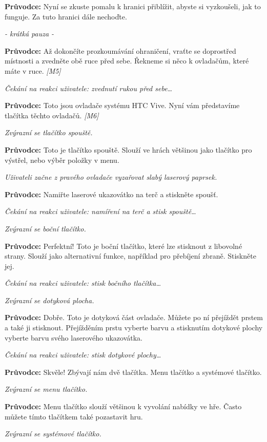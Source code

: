 \textbf{Průvodce:} Nyní se zkuste pomalu k hranici přiblížit, abyste si
vyzkoušeli, jak to funguje. Za tuto hranici dále nechoďte.

\emph{- krátká pauza -}

\textbf{Průvodce:} Až dokončíte prozkoumávání ohraničení, vraťte se
doprostřed místnosti a zvedněte obě ruce před sebe. Řekneme si něco k
ovladačům, které máte v ruce. \emph{{[}M5{]}}

\emph{Čekání na reakci uživatele: zvednutí rukou před sebe\ldots{}}

\textbf{Průvodce:} Toto jsou ovladače systému HTC Vive. Nyní vám
představíme tlačítka těchto ovladačů. \emph{{[}M6{]}}

\emph{Zvýrazní se tlačítko spouště.}

\textbf{Průvodce:} Toto je tlačítko spouště. Slouží ve hrách většinou
jako tlačítko pro výstřel, nebo výběr položky v menu.

\emph{Uživateli začne z pravého ovladače vyzařovat slabý laserový
paprsek.}

\textbf{Průvodce:} Namiřte laserové ukazovátko na terč a stiskněte
spoušť.

\emph{Čekání na reakci uživatele: namíření na terč a stisk
spouště\ldots{}}

\emph{Zvýrazní se boční tlačítko.}

\textbf{Průvodce:} Perfektní! Toto je boční tlačítko, které lze
stisknout z libovolné strany. Slouží jako alternativní funkce, například
pro přebíjení zbraně. Stiskněte jej.

\emph{Čekání na reakci uživatele: stisk bočního tlačítka\ldots{}}

\emph{Zvýrazní se dotyková plocha.}

\textbf{Průvodce:} Dobře. Toto je dotyková část ovladače. Můžete po ní
přejíždět prstem a také ji stisknout. Přejížděním prstu vyberte barvu a
stisknutím dotykové plochy vyberte barvu svého laserového ukazovátka.

\emph{Čekání na reakci uživatele: stisk dotykové plochy\ldots{}}

\textbf{Průvodce:} Skvěle! Zbývají nám dvě tlačítka. Menu tlačítko a
systémové tlačítko.

\emph{Zvýrazní se menu tlačítko.}

\textbf{Průvodce:} Menu tlačítko slouží většinou k vyvolání nabídky ve
hře. Často můžete tímto tlačítkem také pozastavit hru.

\emph{Zvýrazní se systémové tlačítko.}

